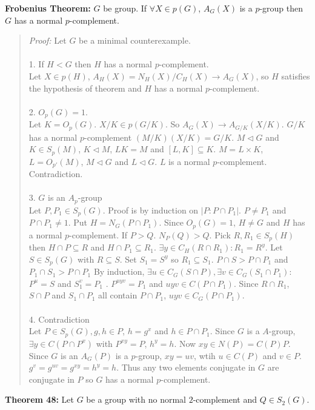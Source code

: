 {\bf Frobenius Theorem:} $G$ be group. If $\forall X \in p(G)$, $A_G(X)$ is a $p$-group then $G$ has a normal
$p$-complement.
\begin{quote}
\emph{Proof:}
Let $G$ be a minimal counterexample.
\\
\\
1. If $H < G$ then $H$ has a normal $p$-complement.
\\
Let $X \in p(H)$, $A_H(X) = N_H(X)/C_H(X) \rightarrow A_G(X)$, so $H$ satisfies the hypothesis of theorem and
$H$ has a normal $p$-complement.
\\
\\
2. $O_p(G) = 1$.
\\
Let $K = O_p(G)$.  $X/K \in p(G/K)$.  So $A_G(X) \rightarrow A_{G/K}(X/K)$.  $G/K$ has a normal $p$-complement
$(M/K) (X/K) = G/K$.  $M \lhd G$ and $K \in S_p(M)$, $K \lhd M$, $LK = M$ and $[L,K] \subseteq K$.
$M = L \times K$,
$L = O_{p'}(M)$,  $M \lhd G$ and $L \lhd G$.  $L$ is a normal $p$-complement.  Contradiction.
\\
\\
3. $G$ is an $A_p$-group
\\
Let $P, P_1 \in S_p(G)$.  Proof is by induction on $|P: P \cap P_1|$.  $P \neq P_1$ and $P \cap P_1 \neq 1$.
Put $H = N_G(P \cap P_1 )$.  Since $O_p(G) = 1$, $H \neq G$ and $H$ has a normal $p$-complement.  If $P > Q$.
$N_P(Q) > Q$.  Pick $R, R_1 \in S_p(H)$ then $H \cap P \subseteq R$ and
$H \cap P_1 \subseteq R_1$.  $\exists y \in C_H(R \cap R_1): R_1 = R^y$.  Let $S \in S_p(G)$ with 
$R \subseteq S$.  Set $S_1 = S^y$ so
$R_1 \subseteq S_1$.   $P \cap S > P \cap P_1$ and $P_1 \cap S_1 > P \cap P_1$
By induction, 
$\exists u \in C_G(S \cap P),
\exists v \in C_G(S_1 \cap P_1):$ $P^u=S$ and $S_1^v=P_1$ .  $P^{uyv} = P_1$ and $uyv \in C(P \cap P_1)$.
Since $R \cap R_1$, $S \cap P$ and $S_1 \cap P_1$ all contain $P \cap P_1$, $uyv \in C_G(P \cap P_1 )$.
\\
\\
4. Contradiction
\\
Let $P \in S_p(G), g,h \in P$, $h= g^x$ and $h \in P \cap P_1$.  Since $G$ is a $A$-group,
$\exists y \in C(P \cap P^x)$ with $P^{xy}=P$, $h^y=h$.  Now $xy \in N(P)= C(P)P$.  
Since $G$ is an $A_G(P)$ is a $p$-group, $xy=uv$, wtih $u \in C(P)$ and $ v \in P$.
$g^v = g^{uv} = g^{xy} = h^y = h$.  Thus any two elements conjugate in $G$ are conjugate in $P$ so $G$ has a normal
$p$-complement.
\end{quote}
{\bf Theorem 48:} Let $G$ be a group with no normal $2$-complement and $Q \in S_2(G)$.
